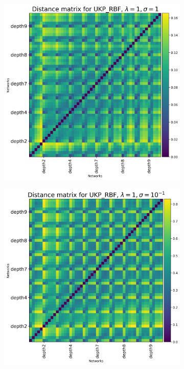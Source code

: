 \documentclass{article}
\theoremstyle{plain}
\begin{document}
\begin{figure}[!h]
    \centering
    \begin{subfigure}[b]{0.3\textwidth}
        \includegraphics[width=\textwidth]{Appendix figures/mnist_experiments/Heatmaps/Heatmap for UKP_dist_RBF_1.000000e+00_1.000000e+00.png}
    \end{subfigure}
    \hfill
    \begin{subfigure}[b]{0.3\textwidth}
        \includegraphics[width=\textwidth]{Appendix figures/mnist_experiments/Heatmaps/Heatmap for UKP_dist_RBF_1.000000e+00_1.000000e-01.png}

\end{subfigure}
\end{figure}
\end{document}
